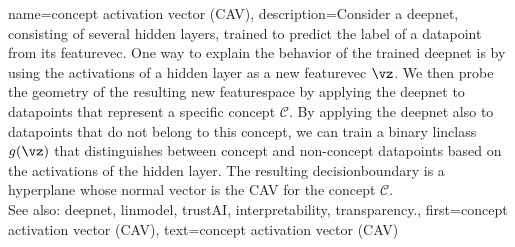 {name={concept activation vector (CAV)},
	description={Consider a \gls{deepnet}, consisting  of several hidden \glspl{layer}, 
		trained to predict the \gls{label} of a \gls{datapoint} from its \gls{featurevec}. One way 
		to explain the behavior of the trained \gls{deepnet} is by using the \glspl{activation} of a 
		hidden \gls{layer} as a new \gls{featurevec} $\vz$. We then probe the geometry of the 
		resulting new \gls{featurespace} by applying the \gls{deepnet} to \glspl{datapoint} 
		that represent a specific concept $\mathcal{C}$. By applying the \gls{deepnet} also to \glspl{datapoint} 
		that do not belong to this concept, we can train a binary \gls{linclass} $g(\vz)$ that distinguishes 
		between concept and non-concept \glspl{datapoint} based on the \glspl{activation} of the hidden \gls{layer}. The resulting 
		\gls{decisionboundary} is a hyperplane whose normal \gls{vector} is the CAV for the concept $\mathcal{C}$. 
				\\
		 See also: \gls{deepnet}, \gls{linmodel}, \gls{trustAI}, \gls{interpretability}, \gls{transparency}.}, 
	first={concept activation vector (CAV)},
	text={concept activation vector (CAV)}
}

